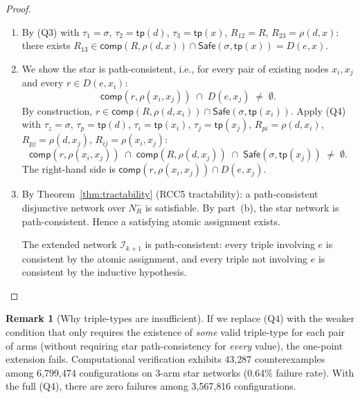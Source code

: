 \documentclass[a4paper,11pt]{article}
\theoremstyle{definition}
\newtheorem{remark}[theorem]{Remark}
\newcommand{\NR}{\ensuremath{N_R^{-}}}
\newcommand{\interp}{\ensuremath{\mathcal{I}}}
\newcommand{\comp}{\ensuremath{\mathsf{comp}}}
\newcommand{\tp}{\ensuremath{\mathsf{tp}}}
\newcommand{\Safe}{\ensuremath{\mathsf{Safe}}}
\begin{document}
\begin{proof}\mbox{}
\begin{enumerate}[nosep,label=\textup{(\alph*)}]
  \item By (Q3) with $\tau_1 = \sigma$, $\tau_2 = \tp(d)$,
    $\tau_3 = \tp(x)$, $R_{12} = R$,
    $R_{23} = \rho(d, x)$: there exists
    $R_{13} \in \comp(R, \rho(d,x)) \cap \Safe(\sigma, \tp(x))
    = D(e, x)$.

  \item We show the star is path-consistent, i.e., for every
    pair of existing nodes $x_i, x_j$ and every $r \in D(e, x_i)$:
    \[
      \comp(r, \rho(x_i, x_j)) \;\cap\; D(e, x_j)
      \;\neq\; \emptyset.
    \]
    By construction, $r \in \comp(R, \rho(d, x_i)) \cap
    \Safe(\sigma, \tp(x_i))$.  Apply (Q4) with
    $\tau_z = \sigma$, $\tau_p = \tp(d)$,
    $\tau_i = \tp(x_i)$, $\tau_j = \tp(x_j)$,
    $R_{pi} = \rho(d, x_i)$, $R_{pj} = \rho(d, x_j)$,
    $R_{ij} = \rho(x_i, x_j)$:
    \[
      \comp(r, \rho(x_i, x_j)) \;\cap\;
      \comp(R, \rho(d, x_j)) \;\cap\;
      \Safe(\sigma, \tp(x_j)) \;\neq\; \emptyset.
    \]
    The right-hand side is
    $\comp(r, \rho(x_i, x_j)) \cap D(e, x_j)$.

  \item By Theorem~\ref{thm:tractability} (RCC5 tractability):
    a path-consistent disjunctive network over
    $\NR$ is satisfiable.  By part~(b),
    the star network is path-consistent.  Hence a
    satisfying atomic assignment exists.

    The extended network $\interp_{k+1}$ is path-consistent:
    every triple involving $e$ is consistent by the
    atomic assignment, and every triple not involving
    $e$ is consistent by the inductive hypothesis.
    \qedhere
\end{enumerate}
\end{proof}

\begin{remark}[Why triple-types are insufficient]
\label{rem:triple-fail}
If we replace (Q4) with the weaker condition that only
requires the existence of \emph{some} valid triple-type for
each pair of arms (without requiring star path-consistency
for \emph{every} value), the one-point extension fails.
Computational verification exhibits 43{,}287 counterexamples
among 6{,}799{,}474 configurations on 3-arm star networks
\textup{(}0.64\% failure rate\textup{)}.  With the full (Q4),
there are zero failures among 3{,}567{,}816 configurations.
\end{remark}
\end{document}
